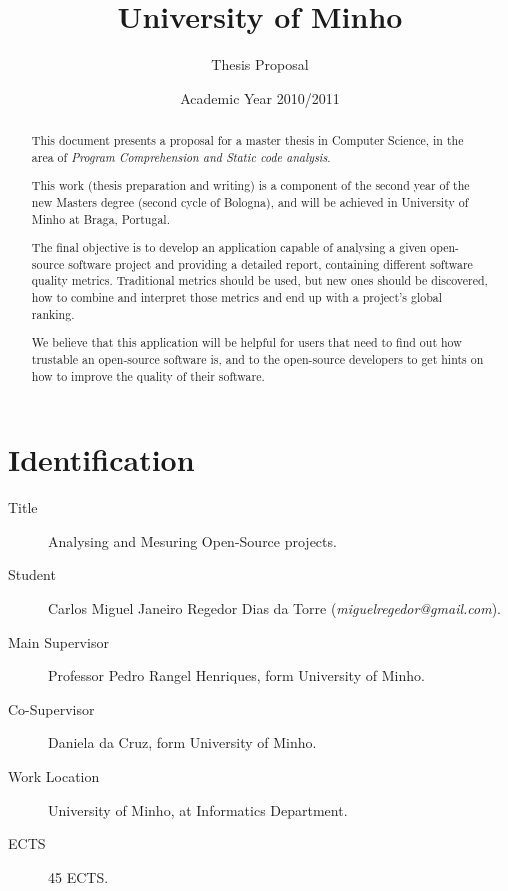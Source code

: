 \documentclass[12pt]{article}
\begin{document}
\title{University of Minho}
\author{Thesis Proposal}

\date{Academic Year 2010/2011}
\maketitle 

\section*{Identification}
\begin{description}
\item[Title] \textsf{Analysing and Mesuring Open-Source projects}.
\item[Student] \textsf{Carlos Miguel Janeiro Regedor Dias da Torre }(\textit{miguelregedor@gmail.com}).
\item[Main Supervisor] \textsf{Professor Pedro Rangel Henriques}, form University of Minho.
\item [Co-Supervisor] \textsf{Daniela da Cruz}, form University of Minho.
\item [Work Location] University of Minho, at Informatics Department.
\item [ECTS] 45 ECTS.
\end{description}


\begin{abstract}
This document presents a proposal for a master thesis in Computer Science, in the area of \textit{Program Comprehension and Static code analysis}.

This work (thesis preparation and writing) is a component of the second year of the new Masters degree (second cycle of Bologna), and will be achieved in University of Minho at Braga, Portugal.

The final objective is to develop an application capable of analysing a given open-source software project and providing a detailed report, containing different software quality metrics. Traditional metrics should be used, but new ones should be discovered, how to combine and interpret those metrics and end up with a project's global ranking.    

We believe that this application will be helpful for users that need to find out how trustable an open-source software is, and to the open-source developers to get hints on how to improve the quality of their software.
\end{abstract}
\end{document}
